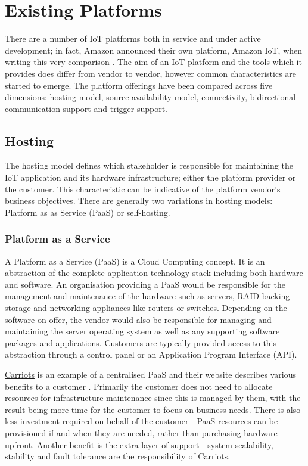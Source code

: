   \section{Existing Platforms}
  \label{existing-platforms}
    There are a number of IoT platforms both in service and under active development; in fact, Amazon announced their own platform, Amazon IoT, when writing this very comparison \citep{AmazonIoT}. The aim of an IoT platform and the tools which it provides does differ from vendor to vendor, however common characteristics are started to emerge. The platform offerings have been compared across five dimensions: hosting model, source availability model, connectivity, bidirectional communication support and trigger support.

    \subsection{Hosting}
      The hosting model defines which stakeholder is responsible for maintaining the IoT application and its hardware infrastructure; either the platform provider or the customer. This characteristic can be indicative of the platform vendor's business objectives. There are generally two variations in hosting models: Platform as as Service (PaaS) or self-hosting.

      \subsubsection{Platform as a Service}
        A Platform as a Service (PaaS) is a Cloud Computing concept. It is an abstraction of the complete application technology stack including both hardware and software. An organisation providing a PaaS would be responsible for the management and maintenance of the hardware such as servers, RAID backing storage and networking appliances like routers or switches. Depending on the software on offer, the vendor would also be responsible for managing and maintaining the server operating system as well as any supporting software packages and applications. Customers are typically provided access to this abstraction through a control panel or an Application Program Interface (API).

        \href{https://www.carriots.com/}{Carriots} is an example of a centralised PaaS and their website describes various benefits to a customer \citep{CarriotsBenefits}. Primarily the customer does not need to allocate resources for infrastructure maintenance since this is managed by them, with the result being more time for the customer to focus on business needs. There is also less investment required on behalf of the customer---PaaS resources can be provisioned if and when they are needed, rather than purchasing hardware upfront. Another benefit is the extra layer of support---system scalability, stability and fault tolerance are the responsibility of Carriots.

